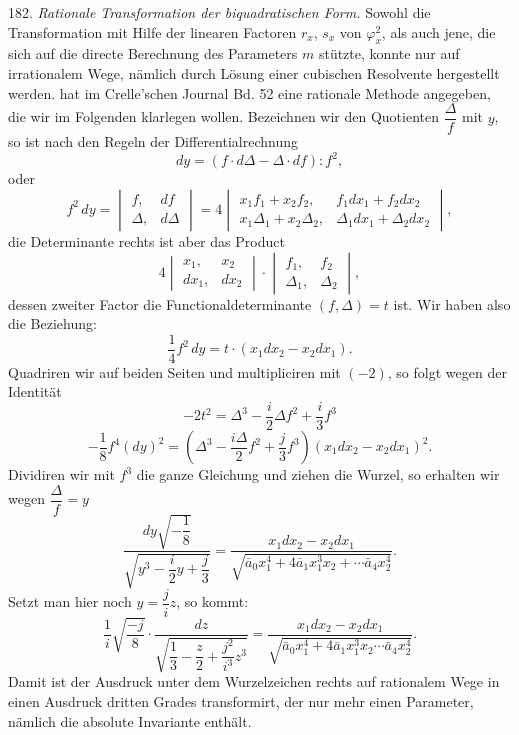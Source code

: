 \documentclass[11pt]{article}
\providecommand{\gesperrt}[1]{\textls[130]{#1}}
\providecommand{\weberpage}[1]{}
\let\Delta\varDelta
\begin{document}
\weberpage{202}
182. \textit{Rationale Transformation der biquadratischen Form.} Sowohl die Transformation mit Hilfe der linearen Factoren $r_x$, $s_x$ von $\varphi_x^2$, als auch jene, die sich auf die directe Berechnung des Parameters $m$ st\"utzte, konnte nur auf irrationalem Wege, n\"amlich durch L\"osung einer cubischen Resolvente hergestellt werden. \gesperrt{Hermite} hat im Crelle'schen Journal Bd. 52 eine rationale Methode angegeben, die wir im Folgenden klarlegen wollen. Bezeichnen wir den Quotienten $\dfrac{\Delta}{f}$ mit $y$, so ist nach den Regeln der Differentialrechnung
\[
dy = (f\cdot d\Delta - \Delta\cdot df):f^2,
\]
oder
\[
f^2\,dy = \begin{vmatrix} f, & df\\ \Delta, & d\Delta \end{vmatrix} = 4\begin{vmatrix} x_1f_1+x_2f_2, & f_1dx_1+f_2dx_2\\ x_1\Delta_1+x_2\Delta_2, & \Delta_1dx_1+\Delta_2dx_2 \end{vmatrix},
\]
die Determinante rechts ist aber das Product
\[
4\begin{vmatrix} x_1, & x_2\\ dx_1, & dx_2 \end{vmatrix}\cdot\begin{vmatrix} f_1, & f_2\\ \Delta_1, & \Delta_2 \end{vmatrix},
\]
dessen zweiter Factor die Functionaldeterminante $(f,\Delta)=t$ ist. Wir haben also die Beziehung:
\[
\frac{1}{4}f^2\,dy = t\cdot(x_1dx_2-x_2dx_1).
\]
Quadriren wir auf beiden Seiten und multipliciren mit $(-2)$, so folgt wegen der Identit\"at
\[
-2t^2 = \Delta^3 - \frac{i}{2}\Delta f^2 + \frac{i}{3}f^3 %
\]
\[
-\frac{1}{8}f^4(dy)^2 = \left(\Delta^3-\frac{i\Delta}{2}f^2+\frac{j}{3}f^3\right)(x_1dx_2-x_2dx_1)^2.
\]
Dividiren wir mit $f^3$ die ganze Gleichung und ziehen die Wurzel, so erhalten wir wegen $\dfrac{\Delta}{f}=y$
\[
\frac{dy\sqrt{-\dfrac{1}{8}}}{\sqrt{y^3-\dfrac{i}{2}y+\dfrac{j}{3}}} = \frac{x_1dx_2-x_2dx_1}{\sqrt{\bar a_0 x_1^4+4\bar a_1 x_1^3x_2+\cdots \bar a_4 x_2^4}}.
\]
Setzt man hier noch $y=\dfrac{j}{i}z$, so kommt:
\[
\frac{1}{i}\sqrt{\frac{-j}{8}}\cdot\frac{dz}{\sqrt{\dfrac{1}{3}-\dfrac{z}{2}+\dfrac{j^2}{i^3}z^3}} = \frac{x_1dx_2-x_2dx_1}{\sqrt{\bar a_0 x_1^4+4\bar a_1 x_1^3x_2\cdots \bar a_4 x_2^4}}.
\]
Damit ist der Ausdruck unter dem Wurzelzeichen rechts auf rationalem Wege in einen Ausdruck dritten Grades transformirt, der nur mehr einen Parameter, n\"amlich die absolute Invariante enth\"alt.
\end{document}
